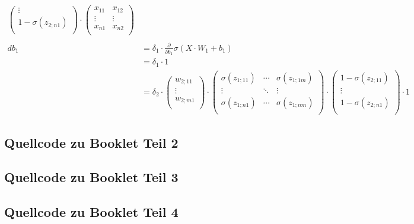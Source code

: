 \begin{align*}
\begin{pmatrix}
                                                                \vdots \\
                                                                1-\sigma (z_{2;n1})  \\
                                                                \end{pmatrix} \cdot \begin{pmatrix}
                                                                                         x_{11} & x_{12}\\
                                                                                         \vdots & \vdots\\
                                                                                         x_{n1} & x_{n2}\\
                                                                                        \end{pmatrix} \\\\
    db_{1} &= \delta_{1} \cdot \frac{\partial}{\partial b_{1}}\sigma(X\cdot W_{1}+b_{1})\\
    &= \delta_{1} \cdot 1\\
    &= \delta_{2} \cdot \begin{pmatrix}
                        w_{2;11} \\
                        \vdots \\
                        w_{2;m1} \\
                        \end{pmatrix} \cdot \begin{pmatrix}
                                            \sigma (z_{1;11})& \cdots & \sigma(z_{1;1m}) \\
                                            \vdots & \ddots &\vdots\\
                                            \sigma (z_{1;n1}) & \cdots & \sigma (z_{1;nm})  \\
                                            \end{pmatrix} \cdot \begin{pmatrix}
                                                                1-\sigma (z_{2;11}) \\
                                                                \vdots \\
                                                                1-\sigma (z_{2;n1})  \\
                                                                \end{pmatrix} \cdot 1
\end{align*}
\subsection{Quellcode zu Booklet Teil 2} \label{app:quellcode_booklet_2}
\pagebreak
\subsection{Quellcode zu Booklet Teil 3}
\pagebreak
\subsection{Quellcode zu Booklet Teil 4}